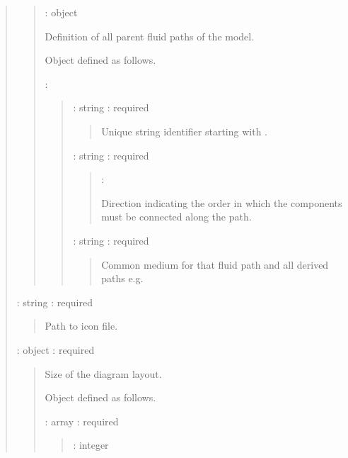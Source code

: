 \documentclass[letterpaper,10pt, openany,english]{sphinxmanual}
\begin{document}
\begin{quote}
\begin{quote}
 : object

\begin{DUlineblock}{0em}
\item[] Definition of all parent fluid paths of the model.
\item[] Object defined as follows.
\end{DUlineblock}

 : 
\begin{quote}

 : string : required
\begin{quote}

Unique string identifier starting with \sphinxcode{\sphinxupquote{\#}}.
\end{quote}

 : string : required
\begin{quote}

 : 

Direction indicating the order in which the components must be connected along the path.
\end{quote}

 : string : required
\begin{quote}

Common medium for that fluid path and all derived paths e.g. 
\end{quote}
\end{quote}
\end{quote}

 : string : required
\begin{quote}

Path to icon file.
\end{quote}

 : object : required
\begin{quote}

Size of the diagram layout.

Object defined as follows.

 : array : required
\begin{quote}

 : integer


\end{quote}
\end{quote}
\end{quote}
\end{document}
